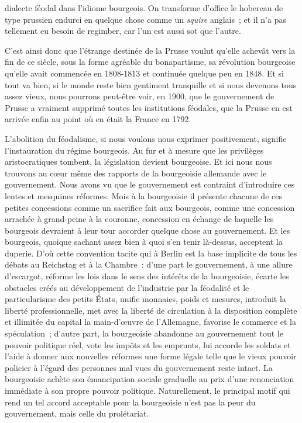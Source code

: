 \documentclass[french,twoside]{book} %
\begin{document}
dialecte féodal dans l’idiome bourgeois. On transforme d’office le hobereau de type prussien endurci en quelque chose comme un \emph{squire} anglais ; et il n’a pas tellement eu besoin de regimber, car l’un est aussi sot que l’autre.\par
C’est ainsi donc que l’étrange destinée de la Prusse voulut qu’elle achevât vers la fin de ce siècle, sous la forme agréable du bonapartisme, sa révolution bourgeoise qu’elle avait commencée en 1808-1813 et continuée quelque peu en 1848. Et si tout va bien, si le monde reste bien gentiment tranquille et si nous devenons tous assez vieux, nous pourrons peut-être voir, en 1900, que le gouvernement de Prusse a vraiment supprimé toutes les institutions féodales, que la Prusse en est arrivée enfin au point où en était la France en 1792.\par
L’abolition du féodalisme, si nous voulons nous exprimer positivement, signifie l’instauration du régime bourgeois. Au fur et à mesure que les privilèges aristocratiques tombent, la législation devient bourgeoise. Et ici nous nous trouvons au cœur même des rapports de la bourgeoisie allemande avec le gouvernement. Nous avons vu que le gouvernement est contraint d’introduire ces lentes et mesquines réformes. Mois à la bourgeoisie il présente chacune de ces petites concessions comme un sacrifice fait aux bourgeois, comme une concession arrachée à grand-peine à la couronne, concession en échange de laquelle les bourgeois devraient à leur tour accorder quelque chose au gouvernement. Et les bourgeois, quoique sachant assez bien à quoi s’en tenir là-dessus, acceptent la duperie. D’où cette convention tacite qui à Berlin est la base implicite de tous les débats au Reichstag et à la Chambre : d’une part le gouvernement, à une allure d’escargot, réforme les lois dans le sens des intérêts de la bourgeoisie, écarte les obstacles créés au développement de l’industrie par la féodalité et le particularisme des petits États, unifie monnaies, poids et mesures, introduit la liberté professionnelle, met avec la liberté de circulation à la disposition complète et illimitée du capital la main-d’œuvre de l’Allemagne, favorise le commerce et la spéculation ; d’autre part, la bourgeoisie abandonne au gouvernement tout le pouvoir politique réel, vote les impôts et les emprunts, lui accorde les soldats et l’aide à donner aux nouvelles réformes une forme légale telle que le vieux pouvoir policier à l’égard des personnes mal vues du gouvernement reste intact. La bourgeoisie achète son émancipation sociale graduelle au prix d’une renonciation immédiate à son propre pouvoir politique. Naturellement, le principal motif qui rend un tel accord acceptable pour la bourgeoisie n’est pas la peur du gouvernement, mais celle du prolétariat.\par
\end{document}
